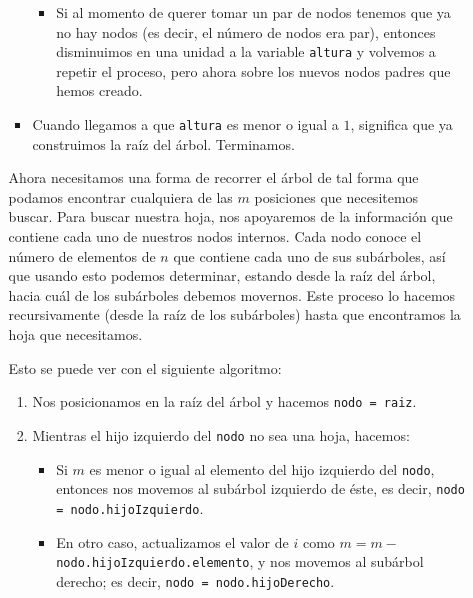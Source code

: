 \documentclass[letterpaper,11pt]{article}
\begin{document}
\begin{enumerate}
\begin{enumerate}
\begin{itemize}
\begin{itemize}
                \item Si al momento de querer tomar un par de nodos tenemos 
                que ya no hay nodos (es decir, el número de nodos era par), 
                entonces disminuimos en una unidad a la variable \texttt{altura}
                y volvemos a repetir el proceso, pero ahora sobre los nuevos 
                nodos padres que hemos creado. 
            \end{itemize}

            \item Cuando llegamos a que \texttt{altura} es menor o igual a $1$, 
            significa que ya construimos la raíz del árbol. Terminamos.
        \end{itemize}

        Ahora necesitamos una forma de recorrer el árbol de tal forma que 
        podamos encontrar cualquiera de las $m$ posiciones que necesitemos 
        buscar. Para buscar nuestra hoja, nos apoyaremos de la información 
        que contiene cada uno de nuestros nodos internos. Cada nodo conoce 
        el número de elementos de $n$ que contiene cada uno de sus subárboles, 
        así que usando esto podemos determinar, estando desde la raíz del árbol, 
        hacia cuál de los subárboles debemos movernos. Este proceso lo hacemos 
        recursivamente (desde la raíz de los subárboles) hasta que encontramos 
        la hoja que necesitamos. 
        
        Esto se puede ver con el siguiente algoritmo:
        \begin{enumerate}
            \item Nos posicionamos en la raíz del árbol y hacemos 
            \texttt{nodo = raiz}.

            \item Mientras el hijo izquierdo del \texttt{nodo} no sea una 
            hoja, hacemos:
            \begin{itemize}
                \item Si $m$ es menor o igual al elemento del hijo izquierdo 
                del \texttt{nodo}, entonces nos movemos al subárbol izquierdo 
                de éste, es decir, \texttt{nodo = nodo.hijoIzquierdo}.

                \item En otro caso, actualizamos el valor de $i$ como 
                $m = m -$ \texttt{nodo.hijoIzquierdo.elemento}, y nos movemos 
                al subárbol derecho; es decir, \texttt{nodo = nodo.hijoDerecho}.
            \end{itemize}


\end{enumerate}
\end{enumerate}
\end{enumerate}
\end{document}
